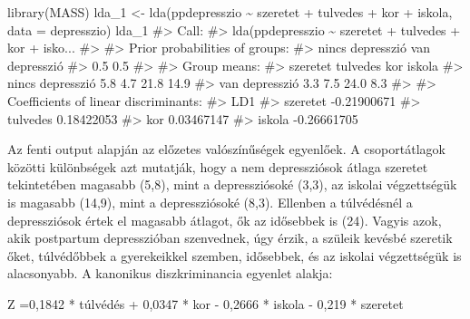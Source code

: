 \documentclass[
  letterpaper,
]{krantz}
\makeatletter
\newenvironment{Shaded}{\begin{snugshade}}{\end{snugshade}}
\newcommand{\AttributeTok}[1]{\textcolor[rgb]{0.40,0.45,0.13}{#1}}
\newcommand{\CommentTok}[1]{\textcolor[rgb]{0.37,0.37,0.37}{#1}}
\newcommand{\FunctionTok}[1]{\textcolor[rgb]{0.28,0.35,0.67}{#1}}
\newcommand{\NormalTok}[1]{\textcolor[rgb]{0.00,0.23,0.31}{#1}}
\newcommand{\OtherTok}[1]{\textcolor[rgb]{0.00,0.23,0.31}{#1}}
\newcommand{\SpecialCharTok}[1]{\textcolor[rgb]{0.37,0.37,0.37}{#1}}
\newenvironment{kframe}{%
\medskip{}
\setlength{\fboxsep}{.8em}
 \def\at@end@of@kframe{}%
 \ifinner\ifhmode%
  \def\at@end@of@kframe{\end{minipage}}%
  \begin{minipage}{\columnwidth}%
 \fi\fi%
 \def\FrameCommand##1{\hskip\@totalleftmargin \hskip-\fboxsep
 \colorbox{shadecolor}{##1}\hskip-\fboxsep
     \hskip-\linewidth \hskip-\@totalleftmargin \hskip\columnwidth}%
 \MakeFramed {\advance\hsize-\width
   \@totalleftmargin\z@ \linewidth\hsize
   \@setminipage}}%
 {\par\unskip\endMakeFramed%
 \at@end@of@kframe}
\renewenvironment{Shaded}{\begin{kframe}}{\end{kframe}}
\makeatother
\begin{document}
\begin{Shaded}
\begin{Highlighting}[]
\FunctionTok{library}\NormalTok{(MASS)}
\NormalTok{lda\_1 }\OtherTok{\textless{}{-}} \FunctionTok{lda}\NormalTok{(ppdepresszio }\SpecialCharTok{\textasciitilde{}}\NormalTok{ szeretet }\SpecialCharTok{+}\NormalTok{ tulvedes }\SpecialCharTok{+}\NormalTok{ kor }\SpecialCharTok{+}\NormalTok{ iskola,}
    \AttributeTok{data =}\NormalTok{ depresszio)}
\NormalTok{lda\_1}
\CommentTok{\#\textgreater{} Call:}
\CommentTok{\#\textgreater{} lda(ppdepresszio \textasciitilde{} szeretet + tulvedes + kor + isko...}
\CommentTok{\#\textgreater{} }
\CommentTok{\#\textgreater{} Prior probabilities of groups:}
\CommentTok{\#\textgreater{} nincs depresszió   van depresszió }
\CommentTok{\#\textgreater{}              0.5              0.5 }
\CommentTok{\#\textgreater{} }
\CommentTok{\#\textgreater{} Group means:}
\CommentTok{\#\textgreater{}                  szeretet tulvedes  kor iskola}
\CommentTok{\#\textgreater{} nincs depresszió      5.8      4.7 21.8   14.9}
\CommentTok{\#\textgreater{} van depresszió        3.3      7.5 24.0    8.3}
\CommentTok{\#\textgreater{} }
\CommentTok{\#\textgreater{} Coefficients of linear discriminants:}
\CommentTok{\#\textgreater{}                  LD1}
\CommentTok{\#\textgreater{} szeretet {-}0.21900671}
\CommentTok{\#\textgreater{} tulvedes  0.18422053}
\CommentTok{\#\textgreater{} kor       0.03467147}
\CommentTok{\#\textgreater{} iskola   {-}0.26661705}
\end{Highlighting}
\end{Shaded}

Az fenti output alapján az előzetes valószínűségek egyenlőek. A
csoportátlagok közötti különbségek azt mutatják, hogy a nem
depressziósok átlaga szeretet tekintetében magasabb (5,8), mint a
depressziósoké (3,3), az iskolai végzettségük is magasabb (14,9), mint a
depressziósoké (8,3). Ellenben a túlvédésnél a depressziósok értek el
magasabb átlagot, ők az idősebbek is (24). Vagyis azok, akik postpartum
depresszióban szenvednek, úgy érzik, a szüleik kevésbé szeretik őket,
túlvédőbbek a gyerekeikkel szemben, idősebbek, és az iskolai
végzettségük is alacsonyabb. A kanonikus diszkriminancia egyenlet
alakja:

\begin{Shaded}
\begin{Highlighting}[]
\NormalTok{Z =0,1842 * túlvédés + 0,0347 * kor {-} 0,2666 * iskola {-} 0,219 * szeretet}
\end{Highlighting}
\end{Shaded}
\end{document}

